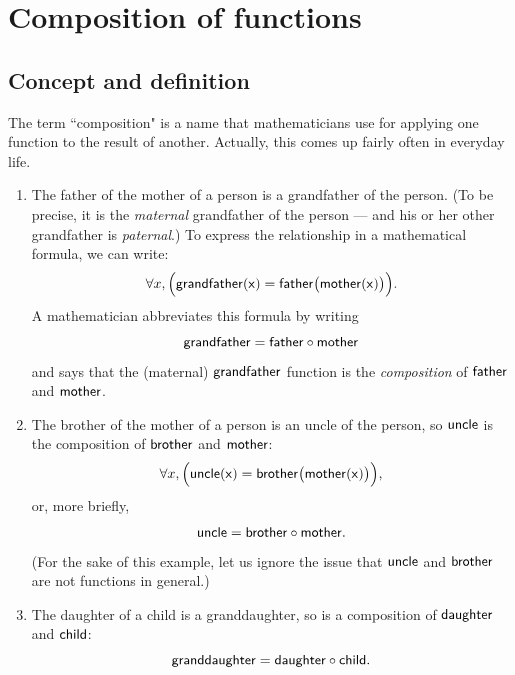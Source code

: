  
  
 \section{Composition of functions}
 
 \subsection{Concept and definition}


\medskip\noindent
The term ``composition" is a name that mathematicians use for applying one function to the result of another. Actually, this  comes up fairly often in everyday life.

\begin{example}{} 
\begin{enumerate}
\item The father of the mother of a person is a grandfather of the person.
 (To be precise, it is the \emph{maternal} grandfather of the person --- and his or her other grandfather is \emph{paternal}.) To express the relationship in a mathematical formula, we can write:
 $$ \forall x,  \Bigl( \sf{grandfather}(x) = \sf{father} \bigl( \sf{mother}(x) \bigr) \Bigr) .$$
 A mathematician abbreviates this formula by writing
 $$ \sf{grandfather} = \sf{father} \circ \sf{mother} $$
 and says that the (maternal) $\sf{grandfather}$ function is the \emph{composition} of $\sf{father}$ and $\sf{mother}$.
 \item The brother of the mother of a person is an uncle of the person, so $\sf{uncle}$ is the composition of $\sf{brother}$ and $\sf{mother}$:
  $$ \forall x, \Bigl( \sf{uncle}(x) = \sf{brother} \bigl( \sf{mother}(x) \bigr) \Bigr) ,$$ 
  or, more briefly,
  $$ \sf{uncle} = \sf{brother} \circ \sf{mother} .$$
 (For the sake of this example, let us ignore the issue that $\sf{uncle}$ and $\sf{brother}$ are not functions in general.)
\item The daughter of a child is a granddaughter, so  is a composition of $\sf{daughter}$ and $\sf{child}$:
$$ \sf{granddaughter} = \sf{daughter} \circ \sf{child} .$$
\end{enumerate}
\end{example}



